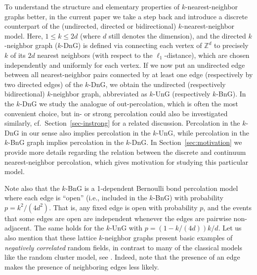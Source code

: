 \documentclass[oneside]{amsart}
\theoremstyle{definition}
\newcommand{\1}{\mathbbm{1}}
\newcommand{\0}{\mathbf{o}}
\newcommand{\Z}{\mathbb{Z}}
\numberwithin{equation}{section}
\begin{document}
To understand the structure and elementary properties of $k$-nearest-neighbor graphs better, in the current paper we take a step back and introduce a discrete counterpart of the (undirected, directed or bidirectional) $k$-nearest-neighbor model. Here, $1 \leq k \leq 2d$ (where $d$ still denotes the dimension), and the directed  $k$-neighbor graph ($k$-DnG) is defined via connecting each vertex of $\Z^d$ to precisely $k$ of its $2d$ nearest neighbors (with respect to the $\ell_1$-distance), which are chosen independently and uniformly for each vertex. If we now put an undirected edge between all nearest-neighbor pairs connected by at least one edge (respectively by two directed edges) of the $k$-DnG, we obtain the undirected (respectively bidirectional) $k$-neighbor graph, abbreviated as $k$-UnG (respectively $k$-BnG). In the $k$-DnG we study the analogue of out-percolation, which is often the most convenient choice, but in- or strong percolation could also be investigated similarly, cf.\ Section~\ref{sec-instrong} for a related discussion. Percolation in the $k$-DnG in our sense also implies percolation in the $k$-UnG, while percolation in the $k$-BnG graph implies percolation in the $k$-DnG. In Section~\ref{sec:motivation} we provide more details regarding the relation between the discrete and continuum nearest-neighbor percolation, which gives motivation for studying this particular model.

Note also that the $k$-BnG is a 1-dependent Bernoulli bond percolation model where each edge is ``open'' (i.e., included in the $k$-BnG) with probability $p=k^2/(4d^2)$. That is, any fixed edge is open with probability $p$, and the events that some edges are open are independent whenever the edges are pairwise non-adjacent. The same holds for the $k$-UnG with $p=(1-k/(4d))k/d$. Let us also mention that these lattice $k$-neighbor graphs present basic examples of {\em negatively correlated} random fields, in contrast to many of the classical models like the random cluster model, see \cite{grimmett2006random}. Indeed, note that the presence of an edge makes the presence of neighboring edges less likely. 
\end{document}
